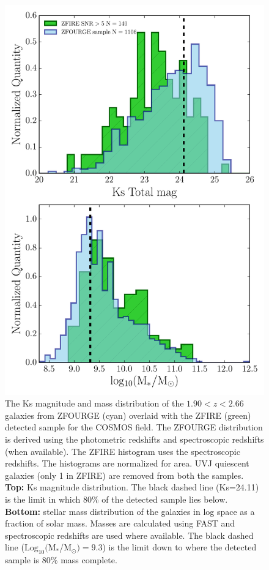 \documentclass[iop]{emulateapj}
\newcommand{\mass}{M$_*$/M$_\odot$}
\begin{document}
\begin{figure}[h!]
\includegraphics[trim = 10 10 10 5, clip, scale=0.58]{figures/detected_limits.pdf}
\caption{The Ks magnitude and mass distribution of the $1.90<z<2.66$ galaxies from ZFOURGE (cyan) overlaid with the ZFIRE (green) detected sample for the COSMOS field. The ZFOURGE distribution is derived using the photometric redshifts and spectroscopic redshifts (when available). The ZFIRE histogram uses the spectroscopic redshifts. 
The histograms are normalized for area. UVJ quiescent galaxies (only 1 in ZFIRE) are removed from both the samples. 
{\bf Top:} Ks magnitude distribution. The black dashed line (Ks=24.11) is the limit in which 80\% of the detected sample lies below. 
{\bf Bottom:} stellar mass distribution of the galaxies in log space as a fraction of solar mass.  Masses are calculated using FAST and spectroscopic redshifts are used where available. The black dashed line ($\mathrm{Log}_{10}($\mass$)=9.3$) is the limit down to where the detected sample is 80\% mass complete.  
}
\label{fig:detection_limits}
\end{figure}
\end{document}
